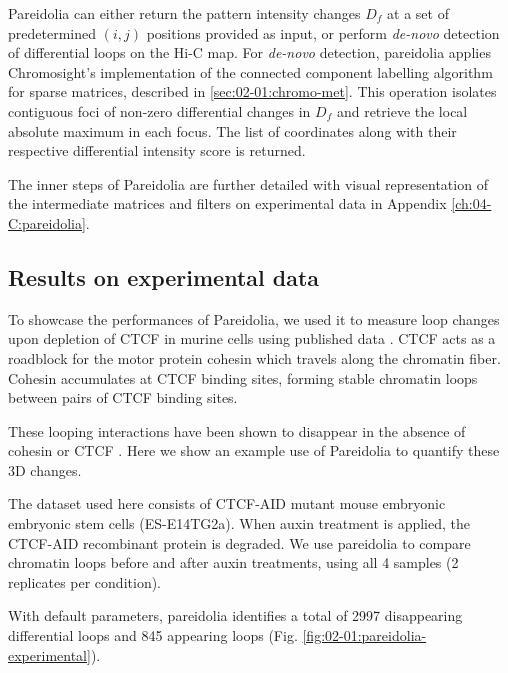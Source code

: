Pareidolia can either return the pattern intensity changes $D_f$ at a set of predetermined $(i, j)$ positions provided as input, or perform \textit{de-novo} detection of differential loops on the Hi-C map. For \textit{de-novo} detection, pareidolia applies Chromosight's implementation of the connected component labelling algorithm for sparse matrices, described in \ref{sec:02-01:chromo-met}. This operation isolates contiguous foci of non-zero differential changes in $D_f$ and retrieve the local absolute maximum in each focus. The list of coordinates along with their respective differential intensity score is returned.

The inner steps of Pareidolia are further detailed with visual representation of the intermediate matrices and filters on experimental data in Appendix \ref{ch:04-C:pareidolia}.

\subsection{Results on experimental data}

To showcase the performances of Pareidolia, we used it to measure loop changes upon depletion of CTCF in murine cells using published data \cite{noraTargetedDegradationCTCF2017}. CTCF acts as a roadblock for the motor protein cohesin which travels along the chromatin fiber. Cohesin accumulates at CTCF binding sites, forming stable chromatin loops between pairs of CTCF binding sites.

These looping interactions have been shown to disappear in the absence of cohesin \cite{raoCohesinLossEliminates2017} or CTCF \cite{noraTargetedDegradationCTCF2017}. Here we show an example use of Pareidolia to quantify these 3D changes.

The dataset used here consists of CTCF-AID mutant mouse embryonic embryonic stem cells (ES-E14TG2a). When auxin treatment is applied, the CTCF-AID recombinant protein is degraded. We use pareidolia to compare chromatin loops before and after auxin treatments, using all 4 samples (2 replicates per condition).

With default parameters, pareidolia identifies a total of 2997 disappearing differential loops and 845 appearing loops (Fig. \ref{fig:02-01:pareidolia-experimental}).

